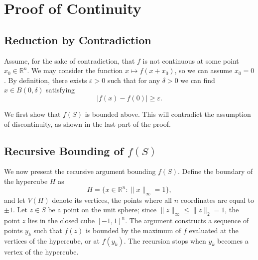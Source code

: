 \documentclass[11pt,a4paper]{article}
\begin{document}
\section{Proof of Continuity}

\subsection{Reduction by Contradiction}

Assume, for the sake of contradiction, that $f$ is not continuous at some point
$x_0 \in \mathbb{R}^n$. We may consider the function $x \mapsto f(x + x_0)$, so
we can assume $x_0 = 0$. By definition, there exists $\varepsilon > 0$ such that
for any $\delta > 0$ we can find $x \in B(0, \delta)$ satisfying
\[
  |f(x) - f(0)| \ge \varepsilon .
\]

We first show that $f(S)$ is bounded above. This will contradict the assumption
of discontinuity, as shown in the last part of the proof.

\subsection{Recursive Bounding of \texorpdfstring{$f(S)$}{f(S)}}
\label{sec:bounding}

We now present the recursive argument bounding $f(S)$. Define the boundary of
the hypercube $H$ as
\[
  H = \{ x \in \mathbb{R}^n : \|x\|_\infty = 1 \},
\]
and let $V(H)$ denote its vertices, the points where all $n$ coordinates are
equal to $\pm 1$. Let $z \in S$ be a point on the unit sphere; since
$\|z\|_\infty \le \|z\|_2 = 1$, the point $z$ lies in the closed cube
$[-1,1]^n$. The argument constructs a sequence of points $y_k$ such that $f(z)$
is bounded by the maximum of $f$ evaluated at the vertices of the hypercube, or
at $f(y_k)$. The recursion stops when $y_k$ becomes a vertex of the hypercube.
\end{document}
